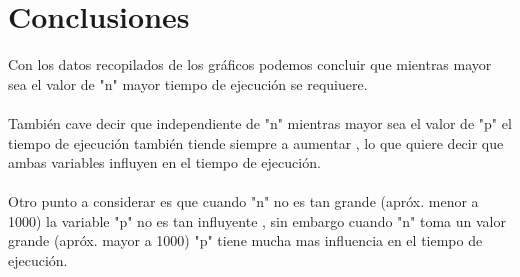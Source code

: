 \documentclass[12pt,letterpaper]{scrartcl}
\begin{document}
\newpage
\section{Conclusiones}

Con los datos recopilados de los gráficos podemos concluir que mientras mayor sea el valor de "n" mayor tiempo de ejecución se requiuere.
\\\\
También cave decir que independiente de "n" mientras mayor sea el valor de "p" el tiempo de ejecución también tiende siempre a aumentar , lo que quiere decir que ambas variables influyen en el tiempo de ejecución.
\\\\
Otro punto a considerar es que cuando "n" no es tan grande (apróx. menor a 1000) la variable "p" no es tan influyente , sin embargo cuando "n" toma un valor grande (apróx. mayor a 1000) "p" tiene mucha mas influencia en el tiempo de ejecución.
\end{document}
